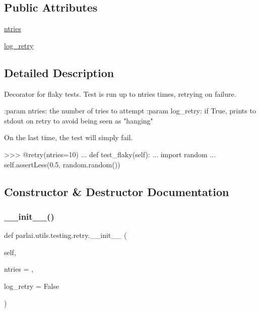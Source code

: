 \subsection*{Public Attributes}
\begin{DoxyCompactItemize}
\item 
\hyperlink{classparlai_1_1utils_1_1testing_1_1retry_abd5233dc28b07a53cd11347e5e44c44f}{ntries}
\item 
\hyperlink{classparlai_1_1utils_1_1testing_1_1retry_a69ead6d82dec33d05ba94a3d561e6dfc}{log\+\_\+retry}
\end{DoxyCompactItemize}


\subsection{Detailed Description}
\begin{DoxyVerb}Decorator for flaky tests. Test is run up to ntries times, retrying on failure.

:param ntries:
    the number of tries to attempt
:param log_retry:
    if True, prints to stdout on retry to avoid being seen as "hanging"

On the last time, the test will simply fail.

>>> @retry(ntries=10)
... def test_flaky(self):
...     import random
...     self.assertLess(0.5, random.random())
\end{DoxyVerb}
 

\subsection{Constructor \& Destructor Documentation}
\mbox{\label{classparlai_1_1utils_1_1testing_1_1retry_afa31eb1816cd31f1a22747e7289747c6}} 
\subsubsection{\texorpdfstring{\+\_\+\+\_\+init\+\_\+\+\_\+()}{\_\_init\_\_()}}
{\footnotesize\ttfamily def parlai.\+utils.\+testing.\+retry.\+\_\+\+\_\+init\+\_\+\+\_\+ (\begin{DoxyParamCaption}\item[{}]{self,  }\item[{}]{ntries = {},  }\item[{}]{log\+\_\+retry = {\ttfamily False} }\end{DoxyParamCaption})}



